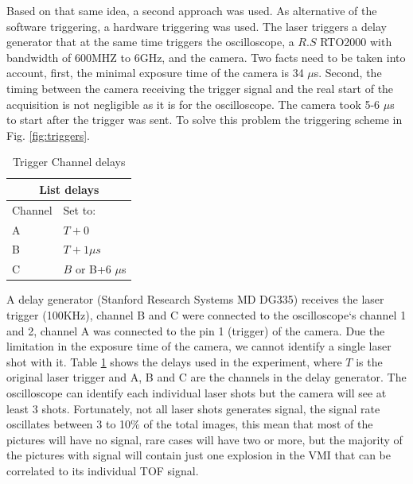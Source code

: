 Based on that same idea, a second approach was used. As alternative of the software triggering, a hardware triggering was used. The laser triggers a delay generator that at the same time triggers the oscilloscope, a $R.S$ RTO2000 with bandwidth of 600MHZ to 6GHz, and the camera. Two facts need to be taken into account, first, the minimal exposure time of the camera is 34 $\mu$s. Second, the timing between the camera receiving the trigger signal and the real start of the acquisition is not negligible as it is for the oscilloscope. The camera took 5-6 $\mu$s to start after the trigger was sent. To solve this problem the triggering scheme in Fig. \ref{fig:triggers}.

\begin{table}[t]

\centering
\begin{tabular}{ll}
\multicolumn{2}{c}{List delays}                                          \\ \hline
\multicolumn{1}{|l|}{Channel} & \multicolumn{1}{l|}{Set to:}    \\ \hline
\multicolumn{1}{|l|}{A}                & \multicolumn{1}{l|}{$T+0$}       \\ \hline
\multicolumn{1}{|l|}{B}                & \multicolumn{1}{l|}{$T+1\mu s$}     \\ \hline
\multicolumn{1}{|l|}{C}                & \multicolumn{1}{l|}{$B$ or B+6 $\mu$s} \\ \hline
\end{tabular}
\caption[trigger Channel delays]{Trigger Channel delays}
\label{tab:delaystriger}
\end{table}

A delay generator (Stanford Research Systems MD DG335) receives the laser trigger (100KHz), channel B and C were connected to the oscilloscope`s channel 1 and 2, channel A was connected to the pin 1 (trigger) of the camera. Due the limitation in the exposure time of the camera, we cannot identify a single laser shot with it. Table \ref{tab:delaystriger} shows the delays used in the experiment, where $T$ is the original laser trigger and A, B and C are the channels in the delay generator. The oscilloscope can identify each individual laser shots but the camera will see at least 3 shots. Fortunately, not all laser shots generates signal, the signal rate oscillates between 3 to 10$\%$ of the total images, this mean that most of the pictures will have no signal, rare cases will have two or more, but the majority of the pictures with signal will contain just one explosion in the VMI that can be correlated to its individual TOF signal. 

